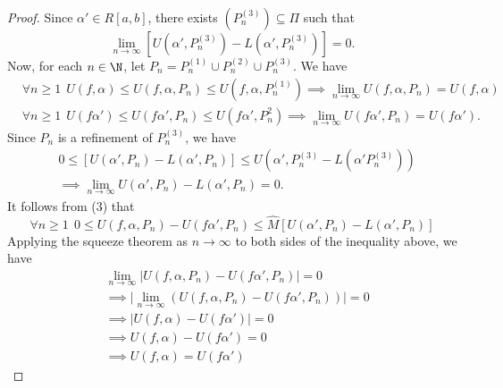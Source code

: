 \begin{proof}
Since \( \alpha' \in R[a,b] \), there exists \( ({P}_{n}^{(3)}) \subseteq \Pi  \) such that 
\[  \lim_{ n \to \infty } [U(\alpha', {P}_{n}^{(3)}) - L(\alpha', {P}_{n}^{(3)})]  = 0.   \]
Now, for each \( n \in \N \), let \( {P}_{n} = {P}_{n}^{(1)} \cup {P}_{n}^{(2)} \cup {P}_{n}^{(3)} \). We have
\begin{align*}
    &\forall n \geq 1 \ \  U(f,\alpha) \leq U(f,\alpha,{P}_{n}) \leq U(f,\alpha, {P}_{n}^{(1)}) \implies \lim_{ n \to \infty  } U(f,\alpha, {P}_{n})  = U(f,\alpha) \tag{4} \\
    &\forall n \geq 1 \ \ U(f \alpha') \leq U(f \alpha' , {P}_{n}) \leq U(f \alpha' , {P}_{n}^{2}) \implies \lim_{ n \to \infty  }  U(f \alpha', {P}_{n}) = U(f \alpha'). \tag{5}
\end{align*}
Since \( {P}_{n} \) is a refinement of \( {P}_{n}^{(3)} \), we have
\begin{align*}
     &0 \leq [U(\alpha', {P}_{n}) - L(\alpha',{P}_{n})] \leq U(\alpha' , {P}_{n}^{(3)} - L(\alpha' {P}_{n}^{(3)})) \\
     &\implies \lim_{ n \to \infty  } U(\alpha', {P}_{n}) - L(\alpha', {P}_{n}) = 0. \tag{6} 
\end{align*}
It follows from (3) that
\[  \forall n \geq 1 \ \ 0 \leq U(f,\alpha, {P}_{n}) - U(f \alpha' , {P}_{n}) \leq \hat{M} [U(\alpha', {P}_{n}) - L(\alpha', {P}_{n})] \]
Applying the squeeze theorem as \( n \to \infty   \) to both sides of the inequality above, we have
\begin{align*}
&\lim_{ n \to \infty   } | U(f,\alpha, {P}_{n}) - U(f \alpha' , {P}_{n}) |  = 0   \\
&\implies \Big| \lim_{ n \to \infty  }  (U(f,\alpha, {P}_{n}) - U(f \alpha', {P}_{n})) \Big| = 0 \\
&\implies | U(f,\alpha) - U(f \alpha') |  = 0 \\
&\implies U(f,\alpha) - U(f \alpha') = 0 \\
&\implies U(f,\alpha) = U(f \alpha')
\end{align*}
\end{proof}

